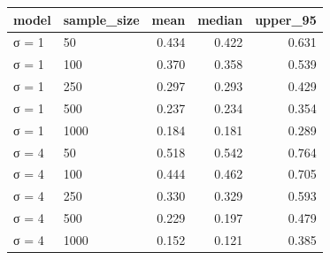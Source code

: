 
\begin{tabular}{llrrr}
\toprule
model & sample\_size & mean & median & upper\_95\\
\midrule
σ = 1 & 50 & 0.434 & 0.422 & 0.631\\
σ = 1 & 100 & 0.370 & 0.358 & 0.539\\
σ = 1 & 250 & 0.297 & 0.293 & 0.429\\
σ = 1 & 500 & 0.237 & 0.234 & 0.354\\
σ = 1 & 1000 & 0.184 & 0.181 & 0.289\\
\addlinespace
σ = 4 & 50 & 0.518 & 0.542 & 0.764\\
σ = 4 & 100 & 0.444 & 0.462 & 0.705\\
σ = 4 & 250 & 0.330 & 0.329 & 0.593\\
σ = 4 & 500 & 0.229 & 0.197 & 0.479\\
σ = 4 & 1000 & 0.152 & 0.121 & 0.385\\
\bottomrule
\end{tabular}
